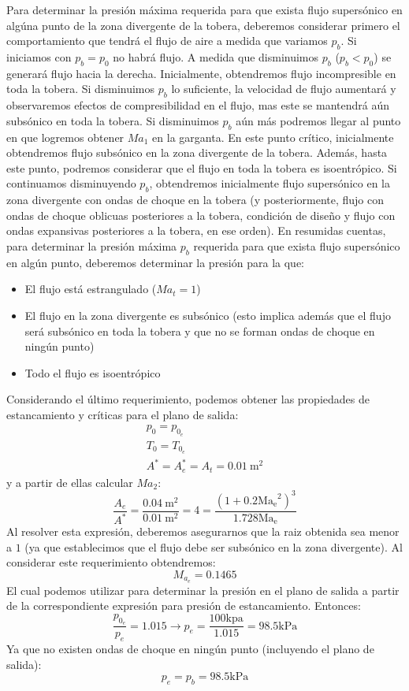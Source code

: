 \documentclass[11pt]{report}
\begin{document}
Para determinar la presi\'on m\'axima requerida para que exista flujo supers\'onico en alg\'una punto de la zona divergente de la tobera, deberemos considerar primero el comportamiento que tendr\'a el flujo de aire a medida que variamos $p_b$. Si iniciamos con $p_b=p_0$ no habr\'a flujo. A medida que disminuimos $p_b$ ($p_b<p_0$) se generar\'a flujo hacia la derecha. Inicialmente, obtendremos flujo incompresible en toda la tobera. Si disminuimos $p_b$ lo suficiente, la velocidad de flujo aumentar\'a y observaremos efectos de compresibilidad en el flujo, mas este se mantendr\'a a\'un subs\'onico en toda la tobera. Si disminuimos $p_b$  a\'un m\'as podremos llegar al punto en que logremos obtener $Ma_1$ en la garganta. En este punto cr\'itico, inicialmente obtendremos flujo subs\'onico en la zona divergente de la tobera. Adem\'as, hasta este punto, podremos considerar que el flujo en toda la tobera es isoentr\'opico. Si continuamos disminuyendo $p_b$, obtendremos inicialmente flujo supers\'onico en la zona divergente con ondas de choque en la tobera (y posteriormente, flujo con ondas de choque oblicuas posteriores a la tobera, condici\'on de diseño y flujo con ondas expansivas posteriores a la tobera, en ese orden). En resumidas cuentas, para determinar la presi\'on m\'axima $p_b$ requerida para que exista flujo supers\'onico en alg\'un punto, deberemos determinar la presi\'on para la que: 
\begin{itemize}
\item El flujo est\'a estrangulado ($Ma_t=1$)
\item El flujo en la zona divergente es subs\'onico (esto implica adem\'as que el flujo ser\'a subs\'onico en toda la tobera y que no se forman ondas de choque en ning\'un punto)
\item Todo el flujo es isoentr\'opico
\end{itemize}

Considerando el \'ultimo requerimiento, podemos obtener las propiedades de estancamiento y cr\'iticas para el plano de salida:
$$
\begin{array}{l}
p_{0}=p_{0_e} \\
T_{0}=T_{0_{e}} \\
A^{*}=A_{e}^{*}=A_{t}=0.01 \mathrm{~m}^{2}
\end{array}
$$
y a partir de ellas calcular $Ma_2$:
$$
\frac{A_{e}}{A^{*}}=\frac{0.04 \mathrm{~m}^{2}}{0.01 \mathrm{~m}^{2}}=4=\frac{\left(1+0.2 \mathrm{Ma_e}^{2}\right)^{3}}{1.728 \mathrm{Ma}_{\mathrm{e}}}
$$
Al resolver esta expresi\'on, deberemos asegurarnos que la raiz obtenida sea menor a $1$ (ya que establecimos que el flujo debe ser subs\'onico en la zona divergente). Al considerar este requerimiento obtendremos:
$$
M_{a_{e}}=0.1465
$$
El cual podemos utilizar para determinar la presi\'on en el plano de salida a partir de la correspondiente expresi\'on para presi\'on de estancamiento. Entonces:
$$
\frac{p_{0_e}}{p_{e}}=1.015\rightarrow p_{e}=\frac{100 \mathrm{kpa}}{1.015}=98.5 \mathrm{kPa}
$$
Ya que no existen ondas de choque en ning\'un punto (incluyendo el plano de salida):
$$
p_{e}=p_{b}=98.5 \mathrm{kPa}
$$
\end{document}
